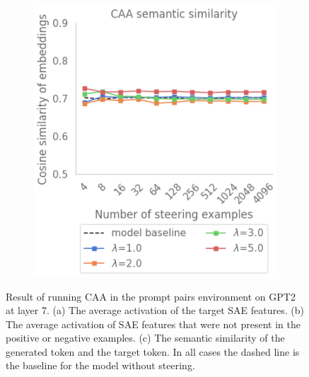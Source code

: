 \begin{figure}
\begin{subfigure}{0.43\textwidth}
        \caption{ }
    \end{subfigure}
    \begin{subfigure}{0.45\textwidth}
        \includegraphics[width=\textwidth]{figures/prompt_pairs_caa_3.png}
        \caption{ }
    \end{subfigure}
    \caption{Result of running CAA \citep{caa} in the prompt pairs environment  on GPT2 at layer 7. (a) The average activation of the target SAE features. (b) The average activation of SAE features that were not present in the positive or negative examples. (c) The semantic similarity of the generated token and the target token. In all cases the dashed line is the baseline for the model without steering.}
    \label{fig:gpt_pp_caa}
\end{figure}

